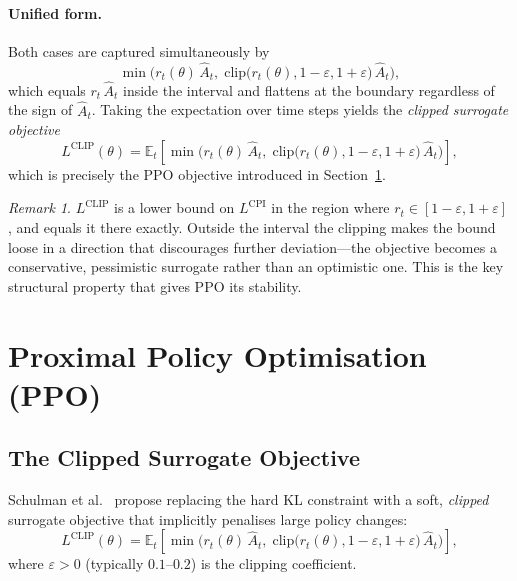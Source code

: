 \documentclass[12pt, a4paper]{article}
\theoremstyle{definition}
\theoremstyle{plain}
\theoremstyle{remark}
\newtheorem{remark}{Remark}[section]
\newcommand{\E}{\mathbb{E}}
\newcommand{\clip}{\mathrm{clip}}
\begin{document}
\paragraph{Unified form.}
Both cases are captured simultaneously by
\begin{equation}
  \min\!\bigl(r_t(\theta)\,\hat{A}_t,\;
              \clip\!\bigl(r_t(\theta), 1-\varepsilon, 1+\varepsilon\bigr)\,\hat{A}_t\bigr),
\end{equation}
which equals $r_t\,\hat{A}_t$ inside the interval and flattens at the boundary
regardless of the sign of $\hat{A}_t$.  Taking the expectation over time steps yields
the \emph{clipped surrogate objective}
\begin{equation}
  L^{\mathrm{CLIP}}(\theta)
    = \E_t\!\left[
        \min\!\bigl(
          r_t(\theta)\,\hat{A}_t,\;
          \clip\!\bigl(r_t(\theta), 1-\varepsilon, 1+\varepsilon\bigr)\,\hat{A}_t
        \bigr)
      \right],
\end{equation}
which is precisely the PPO objective introduced in Section~\ref{sec:ppo}.

\begin{remark}
  $L^{\mathrm{CLIP}}$ is a lower bound on $L^{\mathrm{CPI}}$ in the region where
  $r_t \in [1-\varepsilon, 1+\varepsilon]$, and equals it there exactly.  Outside the
  interval the clipping makes the bound loose in a direction that discourages further
  deviation---the objective becomes a conservative, pessimistic surrogate rather than an
  optimistic one.  This is the key structural property that gives PPO its stability.
\end{remark}

\section{Proximal Policy Optimisation (PPO)}
\label{sec:ppo}

\subsection{The Clipped Surrogate Objective}

Schulman et al.\ \cite{schulman2017ppo} propose replacing the hard KL constraint with a soft,
\emph{clipped} surrogate objective that implicitly penalises large policy changes:
\begin{equation}
  L^{\mathrm{CLIP}}(\theta)
    = \E_t\!\left[
        \min\!\bigl(
          r_t(\theta)\,\hat{A}_t,\;
          \clip\!\bigl(r_t(\theta), 1-\varepsilon, 1+\varepsilon\bigr)\,\hat{A}_t
        \bigr)
      \right],
  \label{eq:clip}
\end{equation}
where $\varepsilon > 0$ (typically $0.1$--$0.2$) is the clipping coefficient.
\end{document}
